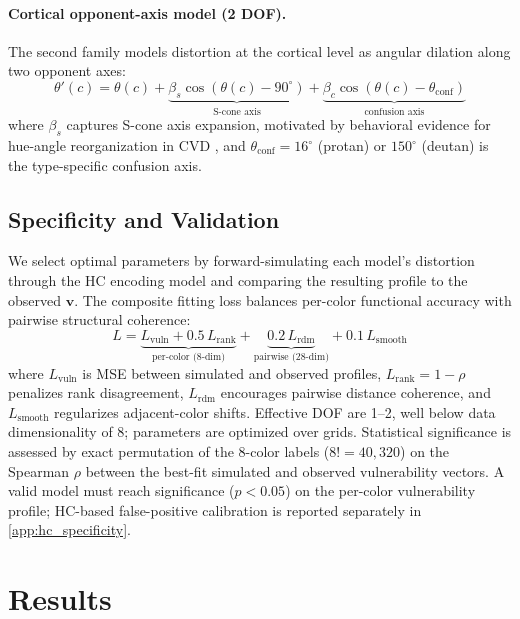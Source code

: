 \documentclass{article}
\begin{document}
\paragraph{Cortical opponent-axis model (2 DOF).}
The second family models distortion at the cortical level as angular dilation along two opponent axes:
\begin{equation}
\theta'(c) = \theta(c) + \underbrace{\beta_s \cos(\theta(c) {-} 90^\circ)}_{\text{S-cone axis}} + \underbrace{\beta_c \cos(\theta(c) {-} \theta_{\text{conf}})}_{\text{confusion axis}}
\label{eq:2comp}
\end{equation}
where $\beta_s$ captures S-cone axis expansion, motivated by behavioral evidence for hue-angle reorganization in CVD \citep{emery2021}, and $\theta_{\text{conf}} = 16^\circ$ (protan) or $150^\circ$ (deutan) is the type-specific confusion axis.

\subsection{Specificity and Validation}

We select optimal parameters by forward-simulating each model's distortion through the HC encoding model and comparing the resulting profile to the observed $\mathbf{v}$.
The composite fitting loss balances per-color functional accuracy with pairwise structural coherence:
\begin{equation}
L = \underbrace{L_{\text{vuln}} + 0.5 \, L_{\text{rank}}}_{\text{per-color (8-dim)}} + \underbrace{0.2 \, L_{\text{rdm}}}_{\text{pairwise (28-dim)}} + 0.1 \, L_{\text{smooth}}
\label{eq:loss}
\end{equation}
where $L_{\text{vuln}}$ is MSE between simulated and observed profiles, $L_{\text{rank}} = 1 - \rho$ penalizes rank disagreement, $L_{\text{rdm}}$ encourages pairwise distance coherence, and $L_{\text{smooth}}$ regularizes adjacent-color shifts.
Effective DOF are 1--2, well below data dimensionality of 8; parameters are optimized over grids.
Statistical significance is assessed by exact permutation of the 8-color labels ($8! = 40{,}320$) on the Spearman $\rho$ between the best-fit simulated and observed vulnerability vectors.
A valid model must reach significance ($p < 0.05$) on the per-color vulnerability profile; HC-based false-positive calibration is reported separately in \cref{app:hc_specificity}.

\section{Results}
\label{sec:results}
\end{document}
